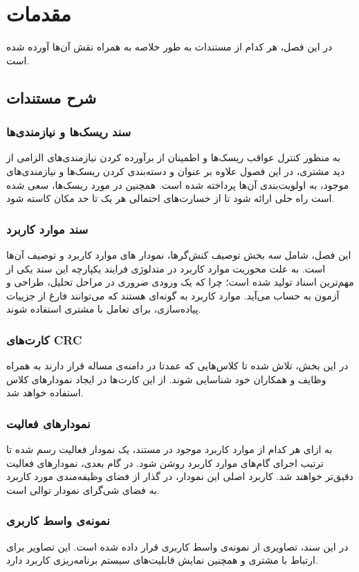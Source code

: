 
\chapter{مقدمات}
در این فصل، هر کدام از مستندات به طور خلاصه به همراه نقش آن‌ها آورده شده است.

\section{شرح مستندات}
\subsection{سند ریسک‌ها و نیازمندی‌ها}
به منظور کنترل عواقب ریسک‌ها و اطمینان از برآورده کردن نیازمندی‌های الزامی از دید مشتری، در این فصول علاوه بر عنوان و دسته‌بندی کردن ریسک‌ها و نیازمندی‌های موجود، به اولویت‌بندی آن‌ها پرداخته شده است. همچنین در مورد ریسک‌ها، سعی شده است راه حلی ارائه شود تا از خسارت‌های احتمالی هر یک تا حد مکان کاسته شود.

\subsection{سند موارد کاربرد}
این فصل، شامل سه بخش توصیف کنش‌گرها، نمودار های موارد کاربرد و توصیف آن‌ها است. به علت محوریت موارد کاربرد در متدلوژی  فرایند یکپارچه   این سند یکی از مهم‌ترین اسناد تولید شده است؛ چرا که یک ورودی ضروری در مراحل تحلیل، طراحی و آزمون به حساب می‌آید. موارد کاربرد به گونه‌ای هستند که می‌توانند فارغ از جزییات پیاده‌سازی، برای تعامل با مشتری استفاده شوند.

\subsection{کارت‌های CRC}
در این بخش، تلاش شده تا کلاس‌هایی که عمدتا در دامنه‌ی مساله قرار دارند به همراه وظایف و همکاران خود شناسایی شوند. از این کارت‌ها در ایجاد نمودارهای کلاس استفاده خواهد شد.

\subsection{نمودارهای فعالیت}
به ازای هر کدام از موارد کاربرد موجود در مستند، یک نمودار فعالیت رسم شده تا ترتیب اجرای گام‌های موارد کاربرد روشن شود. در گام بعدی، نمودارهای فعالیت دقیق‌تر خواهند شد. کاربرد اصلی این نمودار، در گذار از فضای وظیفه‌مندی مورد کاربرد به فضای شی‌گرای نمودار توالی است.

\subsection{نمونه‌ی واسط کاربری}
در این سند، تصاویری از نمونه‌ی واسط کاربری قرار داده شده است. این تصاویر برای ارتباط با مشتری و همچنین نمایش قابلیت‌های سیستم برنامه‌ریزی کاربرد دارد.


